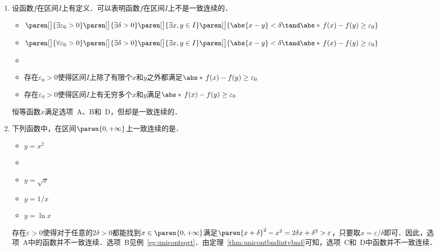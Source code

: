 \begin{enumerate}
\item 设函数\(f\)在区间\(I\)上有定义．\uline{\hfill}可以表明函数\(f\)在区间\(I\)上不是一致连续的．
  \begin{itemize}
    \renewcommand{\labelitemi}{\faCircleThin}
  \item
    \begin{math}
      \paren[\big]{\exists \varepsilon_0 > 0}
      \paren[\big]{\exists \delta > 0}
      \paren[\big]{\exists x,y \in I}
      \paren[\big]{\abs{x-y} < \delta \tand \abs*{\,f(x) - f(y)} \ge \varepsilon_0}
    \end{math}
  \item
    \begin{math}
      \paren[\big]{\forall \varepsilon_0 > 0}
      \paren[\big]{\exists \delta > 0}
      \paren[\big]{\exists x,y \in I}
      \paren[\big]{\abs{x-y} < \delta \tand \abs*{\,f(x) - f(y)} \ge \varepsilon_0}
    \end{math}
    \ifshowsol
  \item[\faCircle]
    \else
  \item
    \fi
    存在\(\varepsilon_0 > 0\)使得区间\(I\)上除了有限个\(x\)和\(y\)之外都满足\(\abs*{\,f(x) - f(y)} \ge \varepsilon_0\)
  \item 存在\(\varepsilon_0 > 0\)使得区间\(I\)上有无穷多个\(x\)和\(y\)满足\(\abs*{\,f(x) - f(y)} \ge \varepsilon_0\)
  \end{itemize}

  \ifshowsol
  恒等函数\(x\)满足选项~A、B和~D，但却是一致连续的．
  \fi

\item 下列函数中，在区间\(\paren{0,+\infty}\)上一致连续的是\uline{\makebox[6em]{}}．
  \begin{itemize}
    \renewcommand{\labelitemi}{\faCircleThin}
  \item \(y = x^2\)
    \ifshowsol
  \item[\faCircle]
    \else
  \item
    \fi
    \(y = \sqrt x\)
  \item \(y = 1/x\)
  \item \(y = \ln x\)
  \end{itemize}

  \ifshowsol
  存在\(\varepsilon > 0\)使得对于任意的\(2\delta > 0\)都能找到\(x \in \paren{0,+\infty}\)满足\(\paren{x+\delta}^2 - x^2 = 2\delta x + \delta^2 > \varepsilon\)，只要取\(x = \varepsilon/\delta\)即可．因此，选项~A中的函数并不一致连续．选项~B见例~\ref{eg:unicontsqrt}．由定理~\ref{thm:unicontbndintvbnd}可知，选项~C和~D中函数并不一致连续．
  \fi


\end{enumerate}
